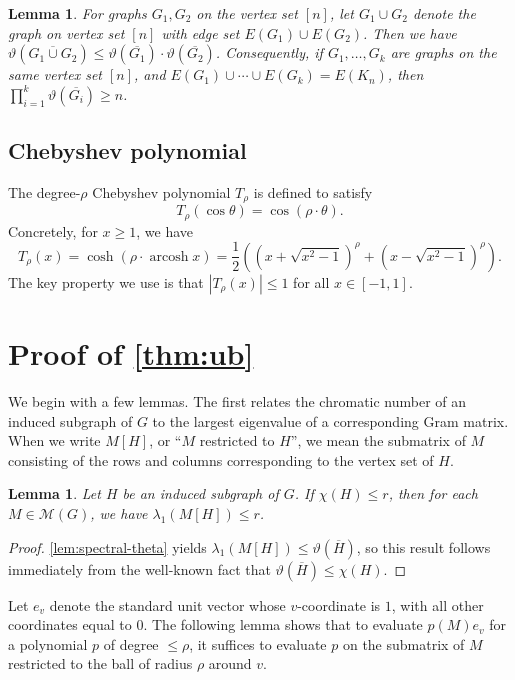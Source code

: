 \documentclass[10pt,a4paper]{amsart}
\newtheorem{lemma}[theorem]{Lemma}
\numberwithin{theorem}{section}
\renewcommand{\le}{\leqslant}
\renewcommand{\ge}{\geqslant}
\newcommand{\lpr}[1]{\left(#1\right)}
\newcommand{\arcosh}{\operatorname{arcosh}}
\newcommand{\ov}[1]{\overline{#1}}
\begin{document}
\begin{lemma}\label{lem:submultiplicative}
    For graphs $G_1, G_2$ on the vertex set $[n]$, let $G_1\cup G_2$ denote the graph on vertex set $[n]$ with edge set $E(G_1)\cup E(G_2)$. Then we have $\vartheta(\ov{G_1\cup G_2})\le \vartheta(\ov{G_1})\cdot \vartheta(\ov{G_2})$. Consequently, if $G_1,\dots,G_k$ are graphs on the same vertex set $[n]$, and  $E(G_1)\cup\cdots\cup E(G_k) = E(K_n)$, then $\prod_{i=1}^k \vartheta(\ov{G_i})\ge n$.
\end{lemma}

\subsection{Chebyshev polynomial}
The degree-$\rho$ Chebyshev polynomial $T_\rho$ is defined to satisfy
\[T_\rho(\cos \theta)=\cos(\rho\cdot\theta).\]
Concretely, for $x\ge 1$, we have
\[T_\rho(x)=\cosh\lpr{\rho\cdot \arcosh x}=\frac{1}{2}\left(\left(x+\sqrt{x^2-1}\right)^\rho+\left(x-\sqrt{x^2-1}\right)^\rho\right).\]
The key property we use is that $|T_\rho(x)|\le 1$ for all $x\in [-1,1]$.

\section{Proof of \cref{thm:ub}}
\label{sec:ub}

We begin with a few lemmas. The first relates the chromatic number of an induced subgraph of $G$ to the largest eigenvalue of a corresponding Gram matrix. When we write $M[H]$, or ``$M$ restricted to $H$'', we mean the submatrix of $M$ consisting of the rows and columns corresponding to the vertex set of $H$.

\begin{lemma}\label{lem:local-r}
Let $H$ be an induced subgraph of $G$. If $\chi(H)\le r$, then for each $M\in\mathcal M(G)$, we have $\lambda_1(M[H])\le r$.
\end{lemma}

\begin{proof}
    \cref{lem:spectral-theta} yields $\lambda_1(M[H])\le \vartheta(\ov H)$, so this result follows immediately from the well-known fact that $\vartheta(\ov H)\le \chi(H)$.
\end{proof}

Let $e_v$ denote the standard unit vector whose $v$-coordinate is $1$, with all other coordinates equal to $0$. The following lemma shows that to evaluate $p(M)e_v$ for a polynomial $p$ of degree $\le \rho$, it suffices to evaluate $p$ on the submatrix of $M$ restricted to the ball of radius $\rho$ around $v$.
\end{document}
